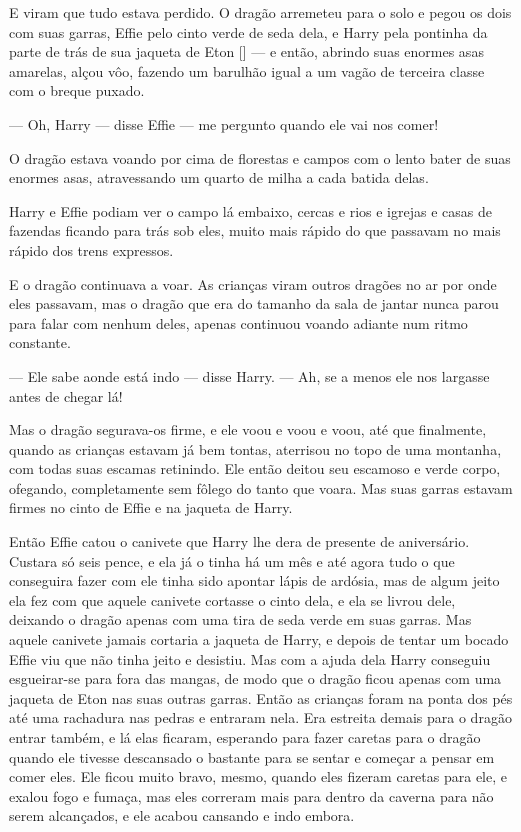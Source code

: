 E viram que tudo estava perdido. O dragão arremeteu para o solo e
pegou os dois com suas garras, Effie pelo cinto verde de seda dela, e
Harry pela pontinha da parte de trás de sua jaqueta de Eton [] — e
então, abrindo suas enormes asas amarelas, alçou vôo, fazendo um
barulhão igual a um vagão de terceira classe com o breque puxado.

— Oh, Harry — disse Effie — me pergunto quando ele vai nos comer!

O dragão estava voando por cima de florestas e campos com o lento
bater de suas enormes asas, atravessando um quarto de milha a cada
batida delas.

Harry e Effie podiam ver o campo lá embaixo, cercas e rios e igrejas e
casas de fazendas ficando para trás sob eles, muito mais rápido do
que passavam no mais rápido dos trens expressos.

E o dragão continuava a voar. As crianças viram outros dragões no ar
por onde eles passavam, mas o dragão que era do tamanho da sala de
jantar nunca parou para falar com nenhum deles, apenas continuou
voando adiante num ritmo constante.

— Ele sabe aonde está indo — disse Harry. — Ah, se a menos ele nos
largasse antes de chegar lá!

Mas o dragão segurava-os firme, e ele voou e voou e voou, até que
finalmente, quando as crianças estavam já bem tontas, aterrisou no
topo de uma montanha, com todas suas escamas retinindo. Ele então
deitou seu escamoso e verde corpo, ofegando, completamente sem fôlego
do tanto que voara. Mas suas garras estavam firmes no cinto de Effie
e na jaqueta de Harry.

Então Effie catou o canivete que Harry lhe dera de presente de
aniversário. Custara só seis pence, e ela já o tinha há um mês e até
agora tudo o que conseguira fazer com ele tinha sido apontar lápis de
ardósia, mas de algum jeito ela fez com que aquele canivete cortasse
o cinto dela, e ela se livrou dele, deixando o dragão apenas com uma
tira de seda verde em suas garras. Mas aquele canivete jamais
cortaria a jaqueta de Harry, e depois de tentar um bocado Effie viu
que não tinha jeito e desistiu. Mas com a ajuda dela Harry conseguiu
esgueirar-se para fora das mangas, de modo que o dragão ficou apenas
com uma jaqueta de Eton nas suas outras garras. Então as crianças
foram na ponta dos pés até uma rachadura nas pedras e entraram nela.
Era estreita demais para o dragão entrar também, e lá elas ficaram,
esperando para fazer caretas para o dragão quando ele tivesse
descansado o bastante para se sentar e começar a pensar em comer
eles. Ele ficou muito bravo, mesmo, quando eles fizeram caretas para
ele, e exalou fogo e fumaça, mas eles correram mais para dentro da
caverna para não serem alcançados, e ele acabou cansando e indo
embora.

